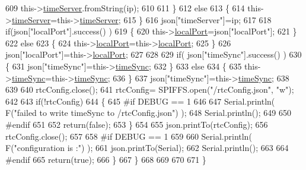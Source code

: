 \begin{DoxyCode}
609                 this->\hyperlink{class_cool_time_ad2b9858f399108cb440dd1e908916f04}{timeServer}.fromString(ip);
610                 
611             \}
612             \textcolor{keywordflow}{else}
613             \{
614                 this->\hyperlink{class_cool_time_ad2b9858f399108cb440dd1e908916f04}{timeServer}=this->\hyperlink{class_cool_time_ad2b9858f399108cb440dd1e908916f04}{timeServer};
615             \}
616             json[\textcolor{stringliteral}{"timeServer"}]=ip;
617             
618             \textcolor{keywordflow}{if}(json[\textcolor{stringliteral}{"localPort"}].success() )
619             \{                       
620                 this->\hyperlink{class_cool_time_a2f777da44d7ba678be8185299e9b49d1}{localPort}=json[\textcolor{stringliteral}{"localPort"}];
621             \}
622             \textcolor{keywordflow}{else}
623             \{
624                 this->\hyperlink{class_cool_time_a2f777da44d7ba678be8185299e9b49d1}{localPort}=this->\hyperlink{class_cool_time_a2f777da44d7ba678be8185299e9b49d1}{localPort};
625             \}
626             json[\textcolor{stringliteral}{"localPort"}]=this->\hyperlink{class_cool_time_a2f777da44d7ba678be8185299e9b49d1}{localPort};
627 
628 
629             \textcolor{keywordflow}{if}( json[\textcolor{stringliteral}{"timeSync"}].success() )
630             \{
631                 json[\textcolor{stringliteral}{"timeSync"}]=this->\hyperlink{class_cool_time_a9d032e76c3470a15b3bbbc52af6463f7}{timeSync};
632             \}
633             \textcolor{keywordflow}{else}
634             \{
635                 this->\hyperlink{class_cool_time_a9d032e76c3470a15b3bbbc52af6463f7}{timeSync}=this->\hyperlink{class_cool_time_a9d032e76c3470a15b3bbbc52af6463f7}{timeSync};
636             \}
637             json[\textcolor{stringliteral}{"timeSync"}]=this->\hyperlink{class_cool_time_a9d032e76c3470a15b3bbbc52af6463f7}{timeSync};
638 
639 
640             rtcConfig.close();
641             rtcConfig= SPIFFS.open(\textcolor{stringliteral}{"/rtcConfig.json"}, \textcolor{stringliteral}{"w"});
642             
643             \textcolor{keywordflow}{if}(!rtcConfig)
644             \{
645 \textcolor{preprocessor}{            #if DEBUG == 1}
646 
647                 Serial.println( F(\textcolor{stringliteral}{"failed to write timeSync to /rtcConfig.json"}) );
648                 Serial.println();
649             
650 \textcolor{preprocessor}{            #endif}
651 
652                 \textcolor{keywordflow}{return}(\textcolor{keyword}{false});
653             \}
654             
655             json.printTo(rtcConfig);
656             rtcConfig.close();
657     
658 \textcolor{preprocessor}{        #if DEBUG == 1}
659 
660             Serial.println( F(\textcolor{stringliteral}{"configuration is :"}) );
661             json.printTo(Serial);
662             Serial.println();
663         
664 \textcolor{preprocessor}{        #endif}
665             \textcolor{keywordflow}{return}(\textcolor{keyword}{true}); 
666         \}
667     \}   
668 
669 
670 
671 \}
\end{DoxyCode}
